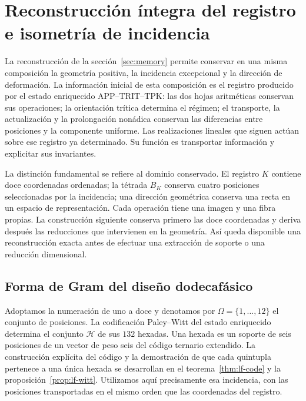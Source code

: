 \section{Reconstrucción íntegra del registro e isometría de incidencia}
\label{rev4:ki:section}

La reconstrucción de la sección~\ref{sec:memory} permite conservar en
una misma composición la geometría positiva, la incidencia excepcional
y la dirección de deformación. La información inicial de esta
composición es el registro producido por el estado enriquecido
APP--TRIT--TPK: las dos hojas aritméticas conservan sus operaciones;
la orientación trítica determina el régimen; el transporte, la
actualización y la prolongación nonádica conservan las diferencias
entre posiciones y la componente uniforme. Las realizaciones lineales
que siguen actúan sobre ese registro ya determinado. Su función es
transportar información y explicitar sus invariantes.

La distinción fundamental se refiere al dominio conservado. El
registro \(K\) contiene doce coordenadas ordenadas; la tétrada
\(B_K\) conserva cuatro posiciones seleccionadas por la incidencia;
una dirección geométrica conserva una recta en un espacio de
representación. Cada operación tiene una imagen y una fibra propias.
La construcción siguiente conserva primero las doce coordenadas y
deriva después las reducciones que intervienen en la geometría. Así
queda disponible una reconstrucción exacta antes de efectuar una
extracción de soporte o una reducción dimensional.

\subsection{Forma de Gram del diseño dodecafásico}
\label{rev4:ki:gram-subsection}

Adoptamos la numeración de uno a doce y denotamos por
\(\Omega=\{1,\ldots,12\}\) el conjunto de posiciones. La
codificación Paley--Witt del estado enriquecido determina el conjunto
\(\mathcal H\) de sus \(132\) hexadas. Una hexada es un soporte
de seis posiciones de un vector de peso seis del código ternario
extendido. La construcción explícita del código y la demostración de
que cada quintupla pertenece a una única hexada se desarrollan en
el teorema~\ref{thm:lf-code} y la
proposición~\ref{prop:lf-witt}. Utilizamos aquí precisamente esa
incidencia, con las posiciones transportadas en el mismo orden que
las coordenadas del registro.

